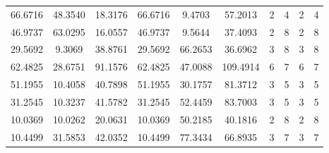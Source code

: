 \documentclass[withoutpreface,bwprint]{cumcmthesis} %
\begin{document}
\begin{appendices}
\begin{table}[htbp!]
\begin{tabular}{@{}cccccccccc@{}}
							66.6716                          & 48.3540                          & 18.3176                          & 66.6716                          & 9.4703                           & 57.2013                          & 2                    & 4                    & 2                      & 4                      \\
							46.9737                          & 63.0295                          & 16.0557                          & 46.9737                          & 9.5644                           & 37.4093                          & 2                    & 8                    & 2                      & 8                      \\
							29.5692                          & 9.3069                           & 38.8761                          & 29.5692                          & 66.2653                          & 36.6962                          & 3                    & 8                    & 3                      & 8                      \\
							62.4825                          & 28.6751                          & 91.1576                          & 62.4825                          & 47.0088                          & 109.4914                         & 6                    & 7                    & 6                      & 7                      \\
							51.1955                          & 10.4058                          & 40.7898                          & 51.1955                          & 30.1757                          & 81.3712                          & 3                    & 5                    & 3                      & 5                      \\
							31.2545                          & 10.3237                          & 41.5782                          & 31.2545                          & 52.4459                          & 83.7003                          & 3                    & 5                    & 3                      & 5                      \\
							10.0369                          & 10.0262                          & 20.0631                          & 10.0369                          & 50.2185                          & 40.1816                          & 2                    & 8                    & 2                      & 8                      \\
							10.4499                          & 31.5853                          & 42.0352                          & 10.4499                          & 77.3434                          & 66.8935                          & 3                    & 7                    & 3                      & 7                      \\

\end{tabular}
\end{table}
\end{appendices}
\end{document}
